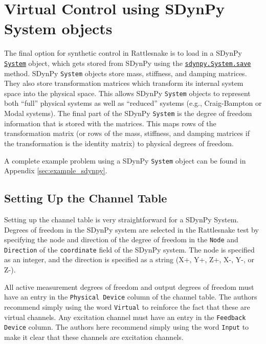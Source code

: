 \documentclass[pdf,12pt,report]{SANDreport}
\newcommand{\inlineCode}{\lstinline[basicstyle=\bfseries\ttfamily]}
\begin{document}
    \chapter{Virtual Control using SDynPy System objects}\label{sec:rattlesnake_hardware_sdynpy_system}
    
    The final option for synthetic control in Rattlesnake is to load in a SDynPy \href{https://sandialabs.github.io/sdynpy/_autosummary/sdynpy.core.sdynpy_system.System.html}{\inlineCode{System}} object, which gets stored from SDynPy using the \href{https://sandialabs.github.io/sdynpy/_autosummary/sdynpy.core.sdynpy_system.System.html#sdynpy.core.sdynpy_system.System.save}{\inlineCode{sdynpy.System.save}} method.  SDynPy \inlineCode{System} objects store mass, stiffness, and damping matrices.  They also store transformation matrices which transform its internal system space into the physical space.  This allows SDynPy \inlineCode{System} objects to represent both ``full'' physical systems as well as ``reduced'' systems (e.g., Craig-Bampton or Modal systems).  The final part of the SDynPy \inlineCode{System} is the degree of freedom information that is stored with the matrices.  This maps rows of the transformation matrix (or rows of the mass, stiffness, and damping matrices if the transformation is the identity matrix) to physical degrees of freedom.
    
    A complete example problem using a SDynPy \inlineCode{System} object can be found in Appendix \ref{sec:example_sdynpy}.
    
    \section{Setting Up the Channel Table}
    
    Setting up the channel table is very straightforward for a SDynPy System.  Degrees of freedom in the SDynPy system are selected in the Rattlesnake test by specifying the node and direction of the degree of freedom in the \inlineCode{Node} and \inlineCode{Direction} of the \inlineCode{coordinate} field of the SDynPy system.  The node is specified as an integer, and the direction is specified as a string (X+, Y+, Z+, X-, Y-, or Z-).
    
    All active measurement degrees of freedom and output degrees of freedom must have an entry in the \inlineCode{Physical Device} column of the channel table.  The authors recommend simply using the word \inlineCode{Virtual} to reinforce the fact that these are virtual channels.  Any excitation channel must have an entry in the \inlineCode{Feedback Device} column.  The authors here recommend simply using the word \inlineCode{Input} to make it clear that these channels are excitation channels.
    
\end{document}
